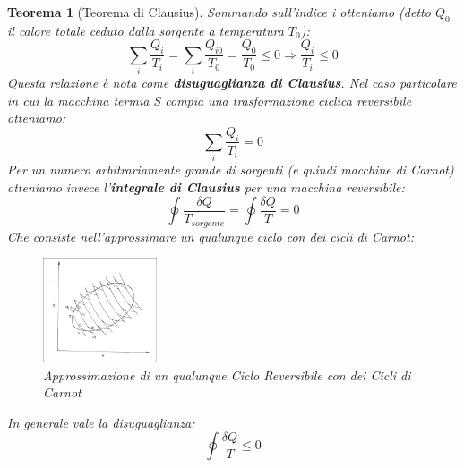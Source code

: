 \documentclass{article}
\newtheorem{thm}{Teorema}[section]
\newcommand{\then}{\ensuremath{\Rightarrow}}
\begin{document}
\begin{thm}[Teorema di Clausius]
Sommando sull'indice i otteniamo (detto $Q_0$ il calore totale ceduto dalla sorgente a temperatura $T_0$):
\[\sum_i\frac{Q_i}{T_i}=\sum_i\frac{Q_{i0}}{T_0}=\frac{Q_0}{T_0}\leq0\then \boxed{\frac{Q_i}{T_i}\leq0}\]
Questa relazione è nota come \textbf{disuguaglianza di Clausius}. Nel caso particolare in cui la macchina termia S compia una trasformazione ciclica reversibile otteniamo:
\begin{equation}
\boxed{\sum_i\frac{Q_i}{T_i}=0}
\end{equation}
Per un numero arbitrariamente grande di sorgenti (e quindi macchine di Carnot) otteniamo invece l'\textbf{integrale di Clausius} per una macchina reversibile:
\begin{equation}
    \boxed{\oint\frac{\delta Q}{T_{sorgente}}=\oint\frac{\delta Q}{T}=0}
\end{equation}
Che consiste nell'approssimare un qualunque ciclo con dei cicli di Carnot:
\begin{figure}[H]
    \centering
    \includegraphics[width=0.3\textwidth]{IntegraleClausius.png}
    \caption{Approssimazione di un qualunque Ciclo Reversibile con dei Cicli di Carnot}
    \label{IntegraleClausius}
\end{figure}
In generale vale la disuguaglianza:
\begin{equation}
\boxed{\oint\frac{\delta Q}{T}\leq0}
\end{equation}
\end{thm}
\end{document}
